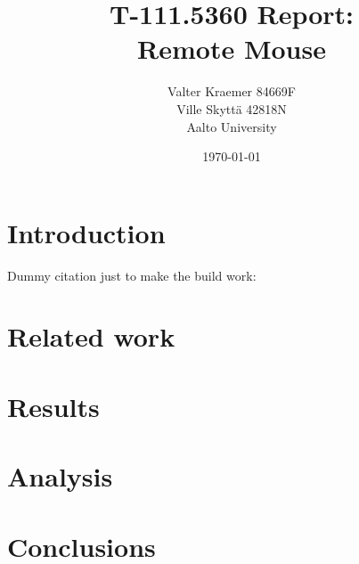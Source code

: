 \documentclass[12pt,a4paper,english,oneside]{article}
\begin{document}
\title{T-111.5360 Report:\\[5mm]
Remote Mouse}

\author{Valter Kraemer 84669F \\
  Ville Skyttä 42818N \\
Aalto University}

\date{\today}

\maketitle

\begin{multicols}{2}


\section{Introduction}

Dummy citation just to make the build work: \citep{bassbouss}

\section{Related work}

\section{Results}

\section{Analysis}

\section{Conclusions}







\end{multicols}
\end{document}
